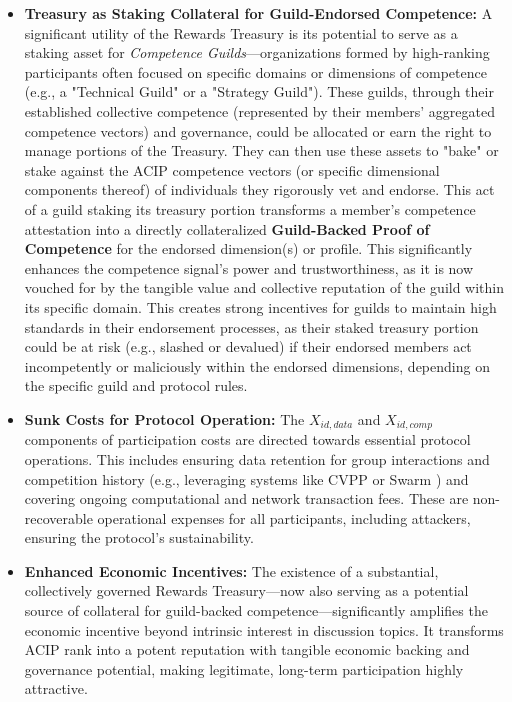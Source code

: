 \documentclass{article}
\begin{document}
\begin{CJK}{UTF8}{gbsn}
\begin{itemize}
            \item \textbf{Treasury as Staking Collateral for Guild-Endorsed Competence:} A significant utility of the Rewards Treasury is its potential to serve as a staking asset for \textit{Competence Guilds}—organizations formed by high-ranking participants often focused on specific domains or dimensions of competence (e.g., a "Technical Guild" or a "Strategy Guild"). These guilds, through their established collective competence (represented by their members' aggregated competence vectors) and governance, could be allocated or earn the right to manage portions of the Treasury. They can then use these assets to "bake" or stake against the ACIP competence vectors (or specific dimensional components thereof) of individuals they rigorously vet and endorse. This act of a guild staking its treasury portion transforms a member's competence attestation into a directly collateralized \textbf{Guild-Backed Proof of Competence} for the endorsed dimension(s) or profile. This significantly enhances the competence signal's power and trustworthiness, as it is now vouched for by the tangible value and collective reputation of the guild within its specific domain. This creates strong incentives for guilds to maintain high standards in their endorsement processes, as their staked treasury portion could be at risk (e.g., slashed or devalued) if their endorsed members act incompetently or maliciously within the endorsed dimensions, depending on the specific guild and protocol rules.

            \item \textbf{Sunk Costs for Protocol Operation:} The $X_{id,data}$ and $X_{id,comp}$ components of participation costs are directed towards essential protocol operations. This includes ensuring data retention for group interactions and competition history (e.g., leveraging systems like CVPP \cite{cvpp} or Swarm \cite{swarm}) and covering ongoing computational and network transaction fees. These are non-recoverable operational expenses for all participants, including attackers, ensuring the protocol's sustainability.

            \item \textbf{Enhanced Economic Incentives:} The existence of a substantial, collectively governed Rewards Treasury—now also serving as a potential source of collateral for guild-backed competence—significantly amplifies the economic incentive beyond intrinsic interest in discussion topics. It transforms ACIP rank into a potent reputation with tangible economic backing and governance potential, making legitimate, long-term participation highly attractive.


\end{itemize}
\end{CJK}
\end{document}
